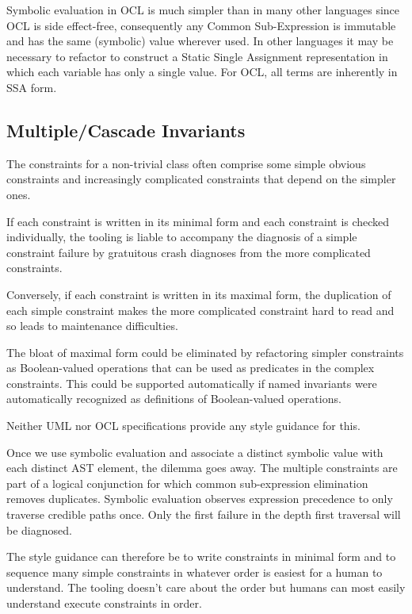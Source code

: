 \documentclass{llncs}
\begin{document}
Symbolic evaluation in OCL is much simpler than in many other languages since OCL is side effect-free, consequently any Common Sub-Expression \cite{DragonBook} is immutable and has the same (symbolic) value wherever used. In other languages it may be necessary to refactor to construct a Static Single Assignment representation in which each variable has only a single value. For OCL, all terms are inherently in SSA form.

\subsection{Multiple/Cascade Invariants}

The constraints for a non-trivial class often comprise some simple obvious constraints and increasingly complicated constraints that depend on the simpler ones.

If each constraint is written in its minimal form and each constraint is checked individually, the tooling is liable to accompany the diagnosis of a simple constraint failure by gratuitous crash diagnoses from the more complicated constraints.

Conversely, if each constraint is written in its maximal form, the duplication of each simple constraint makes the more complicated constraint hard to read and so leads to maintenance difficulties.

The bloat of maximal form could be eliminated by refactoring simpler constraints as Boolean-valued operations that can be used as predicates in the complex constraints. This could be supported automatically if named invariants were automatically recognized as definitions of Boolean-valued operations.

Neither UML nor OCL specifications provide any style guidance for this.

Once we use symbolic evaluation and associate a distinct symbolic value with each distinct AST element, the dilemma goes away. The multiple constraints are part of a logical conjunction for which common sub-expression elimination removes duplicates. Symbolic evaluation observes expression precedence to only traverse credible paths once. Only the first failure in the depth first traversal will be diagnosed.

The style guidance can therefore be to write constraints in minimal form and to sequence many simple constraints in whatever order is easiest for a human to understand. The tooling doesn't care about the order but humans can most easily understand execute constraints in order.
\end{document}
